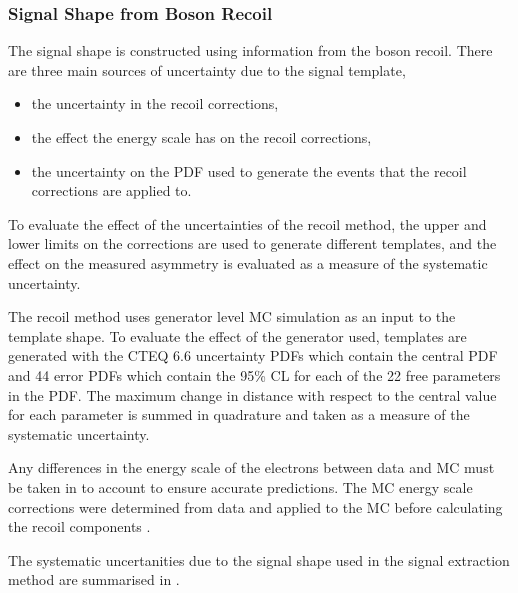 \subsubsection{Signal \ETm Shape from Boson Recoil}

The signal \ETm shape is constructed using information from the boson recoil.
There are three main sources of uncertainty due to the signal template,

\begin{itemize}
    \item the uncertainty in the recoil corrections,
    \item the effect the energy scale has on the recoil corrections,
    \item the uncertainty on the \ac{PDF} used to generate the events that the
recoil corrections are applied to.
\end{itemize}

To evaluate the effect of the uncertainties of the recoil method, the upper and
lower limits on the corrections are used to generate different templates, and
the effect on the measured asymmetry is evaluated as a measure of the
systematic uncertainty.

The recoil method uses generator level \ac{MC} simulation as an input to the
template shape. To evaluate the effect of the generator used, templates are
generated with the CTEQ 6.6 \cite{CTEQ}
uncertainty \acp{PDF} which contain the central \ac{PDF} and 44 error \acp{PDF}
which contain the \unit{95}{\%} \ac{CL} for each of the 22 free parameters in
the \ac{PDF}. The maximum change in distance with respect to the central value
for each parameter is summed in quadrature and taken as a measure of the
systematic uncertainty.

Any differences in the energy scale of the electrons between data and \ac{MC}
must be taken in to account to ensure accurate \ETm predictions. The \ac{MC} energy
scale corrections were determined from \PZ data and applied to the \PZ \ac{MC}
before calculating the recoil components \cite{recoil}. 

The systematic uncertanities due to the signal \ETm shape used in the signal
extraction method are summarised in .

